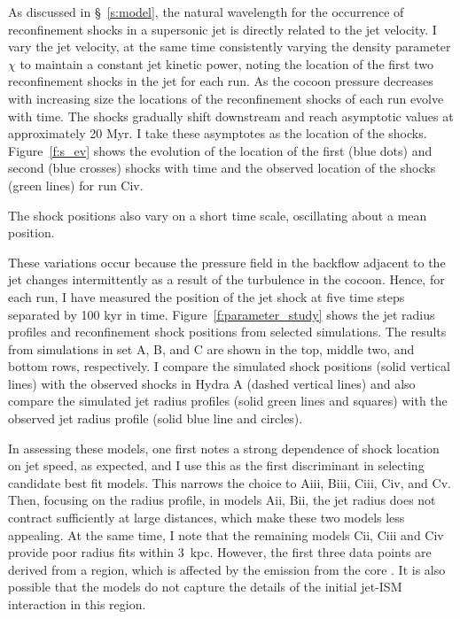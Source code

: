 As discussed in \S~\ref{s:model}, the natural wavelength for the occurrence of reconfinement shocks in a supersonic jet is directly related to the jet velocity. I vary the jet velocity, at the same time consistently varying the density parameter $\chi$ to maintain a constant jet kinetic power, noting the location of the first two reconfinement shocks in the jet for each run.
As the cocoon pressure decreases with increasing size the locations of the reconfinement shocks of each run evolve with time. The shocks gradually shift downstream and reach asymptotic values at approximately 20 Myr. I take these asymptotes as the location of the shocks.  Figure~\ref{f:s_ev} shows the evolution of the location of the first (blue dots) and second (blue crosses) shocks with time and the observed location of the shocks (green lines) for run Civ.

The shock positions also vary on a short time scale, oscillating about a mean position.

These variations occur because the pressure field in the backflow adjacent to the jet changes intermittently as a result of the turbulence in the cocoon. Hence, for each run, I have measured the position of the jet shock at five time steps separated by 100 kyr in time. Figure~\ref{f:parameter_study} shows the jet radius profiles and reconfinement shock positions from selected simulations. The results from simulations in set A, B, and C are shown in the top, middle two, and bottom rows, respectively. I compare the simulated shock positions (solid vertical lines) with the observed shocks in Hydra A (dashed vertical lines) and  also compare the simulated jet radius profiles (solid green lines and squares) with the observed jet radius profile (solid blue line and circles).

In assessing these models, one first notes a strong dependence of shock location on jet speed, as expected, and I use this as the first discriminant in selecting candidate best fit models. This narrows the choice to Aiii, Biii, Ciii, Civ, and Cv. Then, focusing on the radius profile, in models Aii, Bii, the jet radius does not contract sufficiently at large distances, which make these two models less appealing. At the same time, I note that the remaining models Cii, Ciii and Civ provide poor radius fits within 3~kpc.  However, the first three data points are derived from a region, which is affected by the emission from the core \citep[see][Fig. 3]{taylor90}. It is also possible that the models do not capture the details of the initial jet-ISM interaction in this region.

